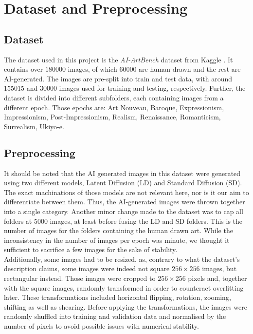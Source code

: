 \chapter{Dataset and Preprocessing}
\label{ch:dataset}

\section{Dataset}

The dataset used in this project is the \textit{AI-ArtBench} dataset from Kaggle \cite{aiartbench}.
It contains over $180000$ images, of which $60000$ are human-drawn and the rest are AI-generated.
The images are pre-split into train and test data, with around $155015$ and $30000$ images used for training and testing, respectively.
Further, the dataset is divided into different subfolders, each containing images from a different epoch.
Those epochs are: Art Nouveau, Baroque, Expressionism, Impressionism, Post-Impressionism, Realism, Renaissance, Romanticism, Surrealism, Ukiyo-e. \\

\section{Preprocessing}

It should be noted that the AI generated images in this dataset were generated using two different models, Latent Diffusion (LD) and Standard Diffusion (SD).
The exact machinations of those models are not relevant here, nor is it our aim to differentiate between them.
Thus, the AI-generated images were thrown together into a single category.
Another minor change made to the dataset was to cap all folders at $5000$ images, at least before fusing the LD and SD folders.
This is the number of images for the folders containing the human drawn art.
While the inconsistency in the number of images per epoch was minute, we thought it sufficient to sacrifice a few images for the sake of stability. \\

Additionally, some images had to be resized, as, contrary to what the dataset's description claims, some images were indeed not square $256 \times 256$ images,
but rectangular instead.
Those images were cropped to $256 \times 256$ pixels and, together with the square images, randomly transformed in order to counteract overfitting later.
These transformations included horizontal flipping, rotation, zooming, shifting as well as shearing. 
Before applying the transformations, the images were randomly shuffled into training and validation data and normalised by the number of pixels to avoid possible issues with numerical stability.

